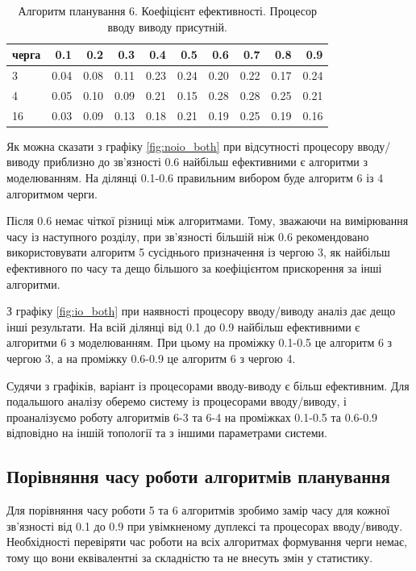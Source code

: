 \begin{table}[H]
\caption{Алгоритм планування 6. Коефіцієнт ефективності. Процесор вводу виводу присутній.}
\label{tab:big_table}
\centering
\begin{tabular}{lrrrrrrrrr}
\toprule
черга &   0.1 &   0.2 &   0.3 &   0.4 &   0.5 &   0.6 &   0.7 &   0.8 &   0.9 \\
\midrule
3 & 0.04 & 0.08 & 0.11 & 0.23 & 0.24 & 0.20 & 0.22 & 0.17 & 0.24 \\
4 & 0.05 & 0.10 & 0.09 & 0.21 & 0.15 & 0.28 & 0.28 & 0.25 & 0.21 \\
16 & 0.03 & 0.09 & 0.13 & 0.18 & 0.21 & 0.19 & 0.25 & 0.19 & 0.16 \\
\bottomrule
\end{tabular}
\end{table}

Як можна сказати з графіку \ref{fig:noio_both} при відсутності процесору вводу/виводу приблизно до зв'язності 0.6 найбільш ефективними є алгоритми з моделюванням. На ділянці 0.1-0.6 правильним вибором буде алгоритм 6 із 4 алгоритмом черги.

Після 0.6 немає чіткої різниці між алгоритмами. Тому, зважаючи на вимірювання часу із наступного розділу, при зв'язності більшій ніж 0.6 рекомендовано використовувати алгоритм 5 сусіднього призначення із чергою 3, як найбільш ефективного по часу та дещо більшого за коефіцієнтом прискорення за інші алгоритми.

З графіку \ref{fig:io_both} при наявності процесору вводу/виводу аналіз дає дещо інші результати. На всій ділянці від 0.1 до 0.9 найбільш ефективними є алгоритми 6 з моделюванням. При цьому на проміжку 0.1-0.5 це алгоритм 6 з чергою 3, а на проміжку 0.6-0.9 це алгоритм 6 з чергою 4.

Судячи з графіків, варіант із процесорами вводу-виводу є більш ефективним. Для подальшого аналізу оберемо систему із процесорами вводу/виводу, і проаналізуємо роботу алгоритмів 6-3 та 6-4 на проміжках 0.1-0.5 та 0.6-0.9 відповідно на іншій топології та з іншими параметрами системи.

\subsection{Порівняння часу роботи алгоритмів планування}

Для порівняння часу роботи 5 та 6 алгоритмів зробимо замір часу для кожної зв'язності від 0.1 до 0.9 при увімкненому дуплексі та процесорах вводу/виводу.
Необхідності перевіряти час роботи на всіх алгоритмах формування черги немає, тому що вони еквівалентні за складністю та не внесуть змін у статистику.

